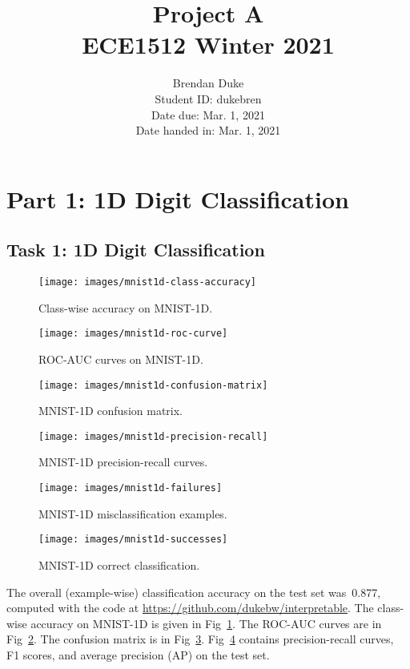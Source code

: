 \documentclass{article}
\title{Project A \\ECE1512 Winter 2021}
\author{Brendan Duke\\Student ID: dukebren\\Date due: Mar. 1, 2021\\Date handed in: Mar. 1, 2021}
\date{}
\begin{document}
\maketitle
\clearpage


\section{Part 1: 1D Digit Classification}


\subsection{Task 1: 1D Digit Classification}

\begin{figure}[t]
	\texttt{[image: images/mnist1d-class-accuracy]}
	\caption{\label{fig:mnist1d-classwise-accuracy}Class-wise accuracy on MNIST-1D\@.}
\end{figure}

\begin{figure}[t]
	\texttt{[image: images/mnist1d-roc-curve]}
	\caption{\label{fig:mnist1d-roc-curve}ROC-AUC curves on MNIST-1D\@.}
\end{figure}

\begin{figure}[t]
	\texttt{[image: images/mnist1d-confusion-matrix]}
	\caption{\label{fig:mnist1d-confusion-matrix}MNIST-1D confusion matrix.}
\end{figure}

\begin{figure}[t]
	\texttt{[image: images/mnist1d-precision-recall]}
	\caption{\label{fig:mnist1d-precision-recall}MNIST-1D precision-recall curves.}
\end{figure}

\begin{figure}[t]
	\texttt{[image: images/mnist1d-failures]}
	\caption{\label{fig:mnist1d-failures}MNIST-1D misclassification examples.}
\end{figure}

\begin{figure}[t]
	\texttt{[image: images/mnist1d-successes]}
	\caption{\label{fig:mnist1d-successes}MNIST-1D correct classification.}
\end{figure}

The overall (example-wise) classification accuracy on the test set was~\num{0.877}, computed with the code at \url{https://github.com/dukebw/interpretable}.
The class-wise accuracy on MNIST-1D is given in Fig~\ref{fig:mnist1d-classwise-accuracy}.
The ROC-AUC curves are in Fig~\ref{fig:mnist1d-roc-curve}.
The confusion matrix is in Fig~\ref{fig:mnist1d-confusion-matrix}.
Fig~\ref{fig:mnist1d-precision-recall} contains precision-recall curves, F1 scores, and average precision (AP) on the test set.
\end{document}
